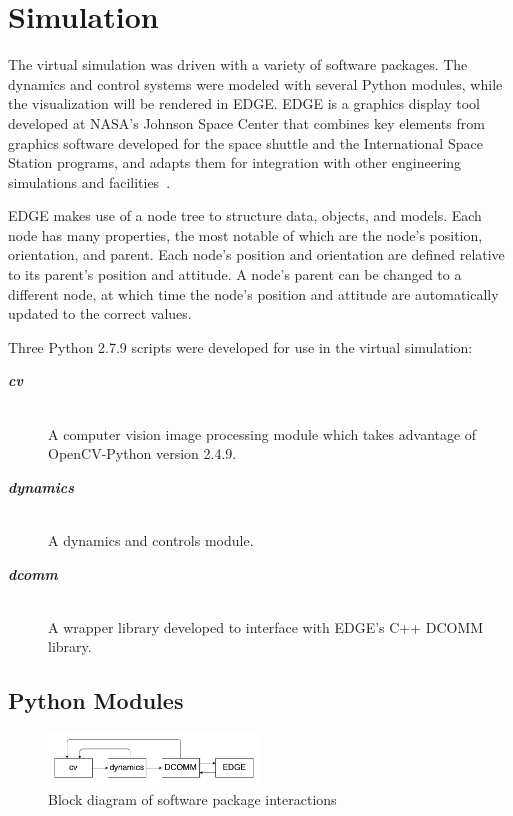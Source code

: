 \documentclass[journal, 10pt]{IEEEtran}
\begin{document}
\section{Simulation}


The virtual simulation was driven with a variety of software packages. The dynamics and control systems were modeled with several Python modules, while the visualization will be rendered in EDGE. EDGE is a graphics display tool developed at NASA's Johnson Space Center that combines key elements from graphics software developed for the space shuttle and the International Space Station programs, and adapts them for integration with other engineering simulations and facilities~\cite{EDGE}.

EDGE makes use of a node tree to structure data, objects, and models. Each node has many properties, the most notable of which are the node's position, orientation, and parent. Each node's position and orientation are defined relative to its parent's position and attitude. A node's parent can be changed to a different node, at which time the node's position and attitude are automatically updated to the correct values.

Three Python 2.7.9 scripts were developed for use in the virtual simulation:
\begin{description}
    \item[\textbf{\textit{cv}}] \hfill \\
    A computer vision image processing module which takes advantage of OpenCV-Python version 2.4.9.
    \item[\textbf{\textit{dynamics}}] \hfill \\
    A dynamics and controls module.
    \item[\textbf{\textit{dcomm}}] \hfill \\
    A wrapper library developed to interface with EDGE's C++ DCOMM library.
\end{description}

\subsection{Python Modules}
\begin{figure}[b]
\begin{center}
\includegraphics[width=0.5\textwidth]{figures/block.pdf}
\caption{Block diagram of software package interactions}
\label{block_diagram}
\end{center}
\end{figure}
\end{document}
